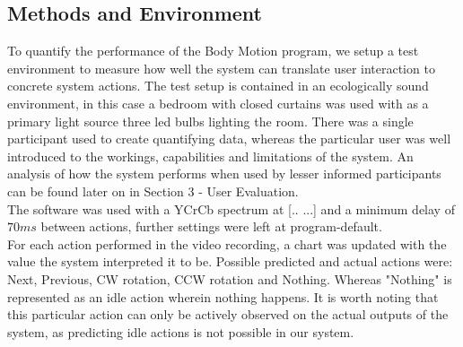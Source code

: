 \documentclass[11pt,a4paper]{article}
\begin{document}
\subsection{Methods and Environment}
To quantify the performance of the Body Motion program, we setup a test environment to measure how well the system can translate user interaction to concrete system actions. The test setup is contained in an ecologically sound environment, in this case a bedroom with closed curtains was used with as a primary light source three led bulbs lighting the room. There was a single participant used to create quantifying data, whereas the particular user was well introduced to the workings, capabilities and limitations of the system. An analysis of how the system performs when used by lesser informed participants can be found later on in Section 3 - User Evaluation.
\\ The software was used with a YCrCb spectrum at [..   ...] and a minimum delay of $70ms$ between actions, further settings were left at program-default.
\\ For each action performed in the video recording, a chart was updated with the value the system interpreted it to be. Possible predicted and actual actions were: Next, Previous, CW rotation, CCW rotation and Nothing. Whereas "Nothing" is represented as an idle action wherein nothing happens. It is worth noting that this particular action can only be actively observed on the actual outputs of the system, as predicting idle actions is not possible in our system.
\end{document}
